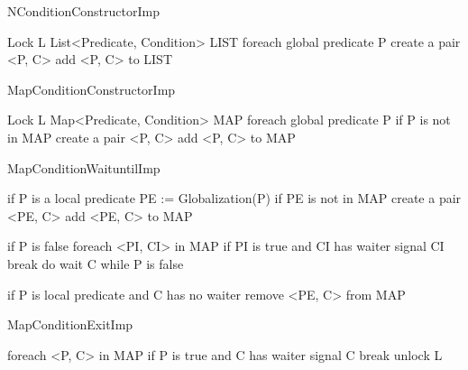 \documentclass[10pt, conference, compsocconf]{IEEEtran}
\begin{document}
\begin{SaveVerbatim}{NConditionConstructorImp}

Lock L
List<Predicate, Condition> LIST
foreach global predicate P
  create a pair <P, C>
  add <P, C> to LIST
\end{SaveVerbatim}

% 
%
%
%


\begin{SaveVerbatim}{MapConditionConstructorImp}

Lock L
Map<Predicate, Condition> MAP
foreach global predicate P
  if P is not in MAP
    create a pair <P, C>
    add <P, C> to MAP 
\end{SaveVerbatim}

\begin{SaveVerbatim}{MapConditionWaituntilImp}

if P is a local predicate 
  PE := Globalization(P)
  if PE is not in MAP
    create a pair <PE, C>
    add <PE, C> to MAP
 
if P is false 
  foreach <PI, CI> in MAP
    if PI is true and CI has waiter
      signal CI
      break
  do 
    wait C
  while P is false

if P is local predicate 
    and C has no waiter
  remove <PE, C> from MAP
\end{SaveVerbatim}

\begin{SaveVerbatim}{MapConditionExitImp}

foreach <P, C> in MAP
  if P is true and C has waiter
    signal C
    break
unlock L
\end{SaveVerbatim}
\end{document}
